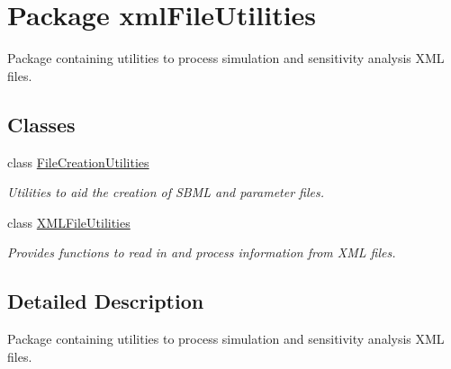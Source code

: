 \hypertarget{namespacexmlFileUtilities}{}\section{Package xml\+File\+Utilities}
\label{namespacexmlFileUtilities}


Package containing utilities to process simulation and sensitivity analysis X\+M\+L files.  


\subsection*{Classes}
\begin{DoxyCompactItemize}
\item 
class \hyperlink{classxmlFileUtilities_1_1FileCreationUtilities}{File\+Creation\+Utilities}
\begin{DoxyCompactList}\small\item\em Utilities to aid the creation of S\+B\+M\+L and parameter files. \end{DoxyCompactList}\item 
class \hyperlink{classxmlFileUtilities_1_1XMLFileUtilities}{X\+M\+L\+File\+Utilities}
\begin{DoxyCompactList}\small\item\em Provides functions to read in and process information from X\+M\+L files. \end{DoxyCompactList}\end{DoxyCompactItemize}


\subsection{Detailed Description}
Package containing utilities to process simulation and sensitivity analysis X\+M\+L files. 